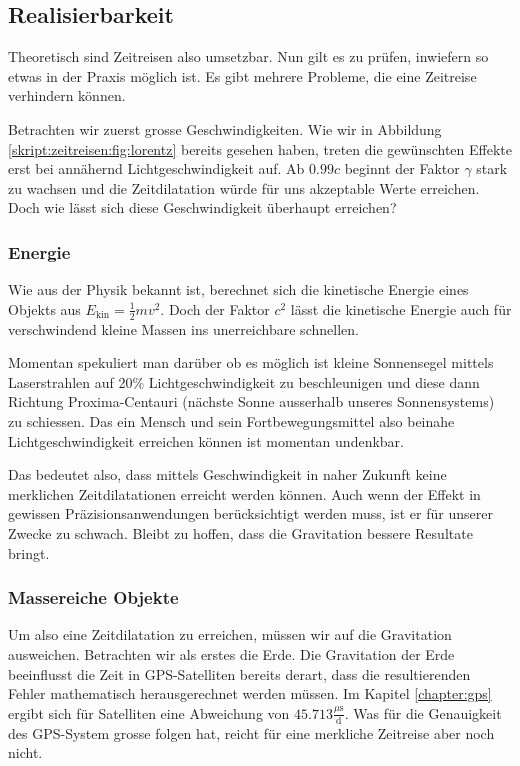 \begin{refsection}
	\section{Realisierbarkeit}
    Theoretisch sind Zeitreisen also umsetzbar. Nun gilt es zu prüfen, inwiefern so etwas in der Praxis möglich ist. Es gibt mehrere Probleme, die eine Zeitreise verhindern können.
    
    Betrachten wir zuerst grosse Geschwindigkeiten. Wie wir in Abbildung \ref{skript:zeitreisen:fig:lorentz} bereits gesehen haben, treten die gewünschten Effekte erst bei annähernd Lichtgeschwindigkeit auf. Ab $0.99c$ beginnt der Faktor $\gamma$ stark zu wachsen und die Zeitdilatation würde für uns akzeptable Werte erreichen.
    Doch wie lässt sich diese Geschwindigkeit überhaupt erreichen?
    
    \subsubsection{Energie}\label{skript:chapters:zrirtreisen:energie}
    Wie aus der Physik bekannt ist, berechnet sich die kinetische Energie eines Objekts aus $E_{\text{kin}}=\frac{1}{2}mv^2$. Doch der Faktor $c^2$ lässt die kinetische Energie auch für verschwindend kleine Massen ins unerreichbare schnellen.
    
    Momentan spekuliert man darüber ob es möglich ist kleine Sonnensegel mittels Laserstrahlen auf 20\% Lichtgeschwindigkeit zu beschleunigen und diese dann Richtung Proxima-Centauri (nächste Sonne ausserhalb unseres Sonnensystems) zu schiessen. Das ein Mensch und sein Fortbewegungsmittel also beinahe Lichtgeschwindigkeit erreichen können ist momentan undenkbar.
    
    Das bedeutet also, dass mittels Geschwindigkeit in naher Zukunft keine merklichen Zeitdilatationen erreicht werden können. Auch wenn der Effekt in gewissen Präzisionsanwendungen berücksichtigt werden muss, ist er für unserer Zwecke zu schwach. Bleibt zu hoffen, dass die Gravitation bessere Resultate bringt. 
    
    \subsubsection{Massereiche Objekte}
    Um also eine Zeitdilatation zu erreichen, müssen wir auf die Gravitation ausweichen. Betrachten wir als erstes die Erde. Die Gravitation der Erde beeinflusst die Zeit in GPS-Satelliten bereits derart, dass die resultierenden Fehler mathematisch herausgerechnet werden müssen. Im Kapitel \ref{chapter:gps} ergibt sich für Satelliten eine Abweichung von $45.713 \frac{\mu\text{s}}{\text{d}}$. Was für die Genauigkeit des GPS-System grosse folgen hat, reicht für eine merkliche Zeitreise aber noch nicht.
    

\end{refsection}
